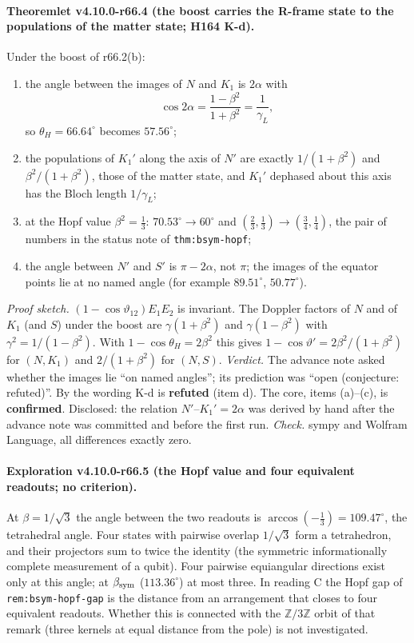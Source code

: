 \paragraph{Theoremlet v4.10.0-r66.4 (the boost carries the R-frame state to the populations of the matter state; H164 K-d).}
Under the boost of r66.2(b):
\begin{enumerate}[leftmargin=2em]
\item[(a)] the angle between the images of \(N\) and \(K_1\) is \(2\alpha\) with
\[
\cos2\alpha=\frac{1-\beta^2}{1+\beta^2}=\frac1{\gamma_L},
\]
so \(\theta_H=66.64^\circ\) becomes \(57.56^\circ\);
\item[(b)] the populations of \(K_1'\) along the axis of \(N'\) are exactly \(1/(1+\beta^2)\) and \(\beta^2/(1+\beta^2)\), those of the matter state,
and \(K_1'\) dephased about this axis has the Bloch length \(1/\gamma_L\);
\item[(c)] at the Hopf value \(\beta^2=\tfrac13\): \(70.53^\circ\to60^\circ\) and \((\tfrac23,\tfrac13)\to(\tfrac34,\tfrac14)\), the pair of numbers in
the status note of \texttt{thm:bsym-hopf};
\item[(d)] the angle between \(N'\) and \(S'\) is \(\pi-2\alpha\), not \(\pi\); the images of the equator points lie at no named angle (for example
\(89.51^\circ\), \(50.77^\circ\)).
\end{enumerate}
\emph{Proof sketch.}  \((1-\cos\vartheta_{12})E_1E_2\) is invariant.  The Doppler factors of \(N\) and of \(K_1\) (and \(S\)) under the boost are
\(\gamma(1+\beta^2)\) and \(\gamma(1-\beta^2)\) with \(\gamma^2=1/(1-\beta^2)\).  With \(1-\cos\theta_H=2\beta^2\) this gives
\(1-\cos\vartheta'=2\beta^2/(1+\beta^2)\) for \((N,K_1)\) and \(2/(1+\beta^2)\) for \((N,S)\).
\emph{Verdict.}  The advance note asked whether the images lie ``on named angles''; its prediction was ``open (conjecture: refuted)''.  By the wording
K-d is \textbf{refuted} (item d).  The core, items (a)--(c), is \textbf{confirmed}.  Disclosed: the relation \(N'\)--\(K_1'=2\alpha\) was derived by hand
after the advance note was committed and before the first run.
\emph{Check.} sympy and Wolfram Language, all differences exactly zero.

\paragraph{Exploration v4.10.0-r66.5 (the Hopf value and four equivalent readouts; no criterion).}
At \(\beta=1/\sqrt3\) the angle between the two readouts is \(\arccos(-\tfrac13)=109.47^\circ\), the tetrahedral angle.  Four states with pairwise
overlap \(1/\sqrt3\) form a tetrahedron, and their projectors sum to twice the identity (the symmetric informationally complete measurement of a
qubit).  Four pairwise equiangular directions exist only at this angle; at \(\beta_{\rm sym}\) (\(113.36^\circ\)) at most three.  In reading C the Hopf
gap of \texttt{rem:bsym-hopf-gap} is the distance from an arrangement that closes to four equivalent readouts.  Whether this is connected with the
\(\mathbb Z/3\mathbb Z\) orbit of that remark (three kernels at equal distance from the pole) is not investigated.

